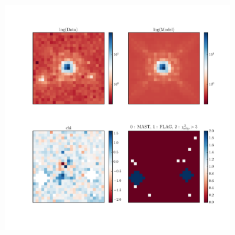 \begin{figure}
\includegraphics[width=0.9\textwidth]{figures/wfc3ir/example19.pdf}
\caption{\label{fig:validation_4} }
\end{figure}


